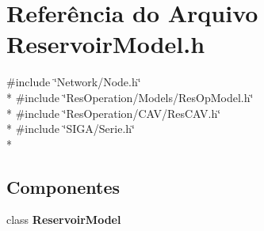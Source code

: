 \section{Referência do Arquivo Reservoir\+Model.\+h}
\label{_reservoir_model_8h}
{\ttfamily \#include \char`\"{}Network/\+Node.\+h\char`\"{}}\\*
{\ttfamily \#include \char`\"{}Res\+Operation/\+Models/\+Res\+Op\+Model.\+h\char`\"{}}\\*
{\ttfamily \#include \char`\"{}Res\+Operation/\+C\+A\+V/\+Res\+C\+A\+V.\+h\char`\"{}}\\*
{\ttfamily \#include \char`\"{}S\+I\+G\+A/\+Serie.\+h\char`\"{}}\\*
\subsection*{Componentes}
\begin{DoxyCompactItemize}
\item 
class {\bf Reservoir\+Model}
\end{DoxyCompactItemize}
